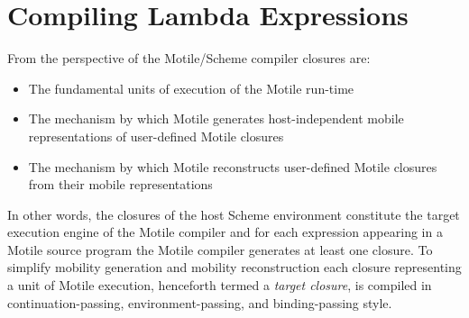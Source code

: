 \documentclass[11pt,peerreview]{IEEEtran}
\begin{document}

\section{Compiling Lambda Expressions}
From the perspective of the Motile/Scheme compiler closures are:
\begin{itemize}
\item The fundamental units of execution of the Motile run-time

\item The mechanism by which Motile generates host-independent mobile representations of user-defined Motile closures

\item The mechanism by which Motile reconstructs user-defined Motile closures from their mobile representations
\end{itemize}
In other words, the closures of the host Scheme environment constitute the target execution engine of the Motile compiler
and for each expression appearing in a Motile source program the Motile compiler generates at least one closure.
To simplify mobility generation and mobility reconstruction each closure representing a unit of Motile execution,
henceforth termed a \emph{target closure}, is compiled
in continuation-passing, environment-passing, and binding-passing style.
\end{document}
